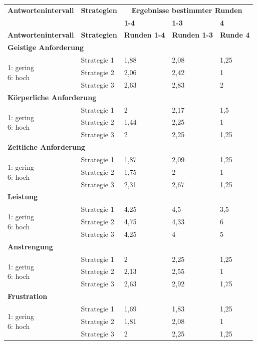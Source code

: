 \documentclass[12pt,a4paper]{scrartcl}
\begin{document}
\newline
\begin{longtable}{|p{4cm}|p{2cm}|p{2cm}|p{2cm}|p{2cm}|}
	\hline
		\textbf{Antwortenintervall}&\textbf{Strategien}&\multicolumn{3}{c|}{\textbf{Ergebnisse bestimmter Runden}}\\
	&&\textbf{1-4}&\textbf{1-3} &\textbf{4}\\
	\hline
	\endfirsthead
	\hline
	\textbf{Antwortenintervall}&\textbf{Strategien}&\textbf{Runden 1-4}&\textbf{Runden 1-3} &\textbf{Runde 4}\\
	\hline
	\endhead
		\multicolumn{5}{l}{\textbf{Geistige Anforderung}}\\
		\hline
\multirow{3}{4cm}{1: gering \newline 6: hoch} & Strategie 1 &  1,88 & 2,08 & 1,25 \\
 & Strategie 2 & 2,06 & 2,42 & 1\\
 & Strategie 3 & 2,63 & 2,83 & 2 \\
\hline
		\multicolumn{5}{l}{\textbf{Körperliche Anforderung}}\\
		\hline
\multirow{3}{4cm}{1: gering \newline 6: hoch} & Strategie 1 & 2 & 2,17 & 1,5 \\
 & Strategie 2 & 1,44 & 2,25 & 1 \\
 & Strategie 3 & 2 & 2,25 & 1,25 \\
\hline
		\multicolumn{5}{l}{\textbf{Zeitliche Anforderung}}\\
		\hline
\multirow{3}{4cm}{1: gering \newline 6: hoch} & Strategie 1 & 1,87 & 2,09 & 1,25 \\
 & Strategie 2 & 1,75 & 2 & 1 \\
 & Strategie 3 & 2,31 & 2,67 & 1,25 \\
\hline
		\multicolumn{5}{l}{\textbf{Leistung}}\\
		\hline
\multirow{3}{4cm}{1: gering \newline 6: hoch} & Strategie 1 & 4,25 & 4,5 & 3,5 \\
 & Strategie 2 & 4,75 & 4,33 & 6 \\
 & Strategie 3 & 4,25 & 4 & 5 \\
\hline
		\multicolumn{5}{l}{\textbf{Anstrengung}}\\
		\hline
\multirow{3}{4cm}{1: gering \newline 6: hoch} & Strategie 1 & 2 & 2,25 & 1,25 \\
 & Strategie 2 & 2,13 & 2,55 & 1 \\
 & Strategie 3 & 2,63 & 2,92 & 1,75\\
\hline
		\multicolumn{5}{l}{\textbf{Frustration}}\\
		\hline
\multirow{3}{4cm}{1: gering \newline 6: hoch} & Strategie 1 & 1,69 & 1,83 & 1,25 \\
 & Strategie 2 & 1,81 & 2,08 & 1 \\
 & Strategie 3 & 2 & 2,25 & 1,25 \\
\hline
\end{longtable}
\end{document}
